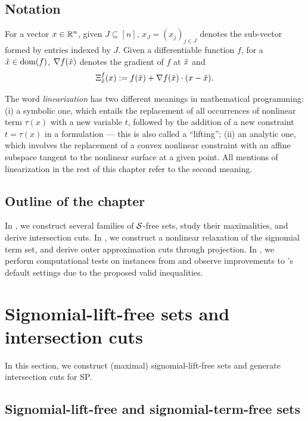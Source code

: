 \subsection{Notation}
 For a vector $x \in \mathbb R^n$, given $J \subseteq [n]$, $x_J = (x_j)_{j \in J}$ denotes  the sub-vector  formed by entries indexed by $J$.  Given a differentiable function $f$, for a $\tilde{x} \in \operatorname{dom}(f)$, $\nabla{f}(\tilde{x})$  denotes the gradient of $f$ at $\tilde{x}$ and  
\begin{equation}
    {\Xi^{f}_{\tilde{x}}}(x) := f(\tilde{x}) + \nabla f(\tilde{x}) \cdot(x - \tilde{x}). \label{def.Xi}
\end{equation}

The word \textit{linearization} has two different meanings in mathematical programming: (i) a symbolic one, which entails the replacement of all occurrences of nonlinear term $\tau(x)$ with a new variable $t$, followed by the addition of a new constraint $t=\tau(x)$ in a formulation --- this is also called a ``lifting''; (ii) an analytic one, which involves the replacement of a convex nonlinear constraint with an affine subspace tangent to the nonlinear surface at a given point. All mentions of linearization in the rest of this chapter refer to the second meaning.


\subsection{Outline of the chapter}
In , we construct several families of $\mathcal S$-free sets, study their maximalities, and derive intersection cuts. In , we construct a nonlinear relaxation of the signomial term set, and derive outer approximation cuts through projection. In ,
we perform computational tests on instances from \minlplib and observe  improvements to \scip's default settings due to the proposed valid inequalities.


\section{Signomial-lift-free sets and intersection cuts}
\label{sec.icforsp}
In this section, we  construct  (maximal) signomial-lift-free sets and generate intersection cuts for SP.  

\subsection{Signomial-lift-free and signomial-term-free sets}
\label{sec.siliftfree}

